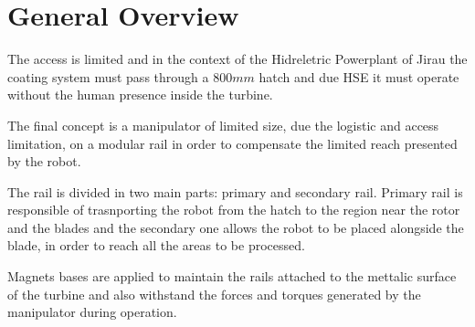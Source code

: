 \section{General Overview}

The access is limited and in the context of the Hidreletric Powerplant of Jirau
the coating system must pass through a $800mm$ hatch and due HSE it must operate
without the human presence inside the turbine. 

The final concept is a manipulator of limited size, due the logistic and
access limitation, on a modular rail in order to compensate the limited reach
presented by the robot.

The rail is divided in two main parts: primary and secondary rail.
Primary rail is responsible of trasnporting the robot from the hatch to the
region near the rotor and the blades and the secondary one allows the robot to
be placed alongside the blade, in order to reach all the areas to be processed.

Magnets bases are applied to maintain the rails attached to the mettalic surface
of the turbine and also withstand the forces and torques generated by the
manipulator during operation.
